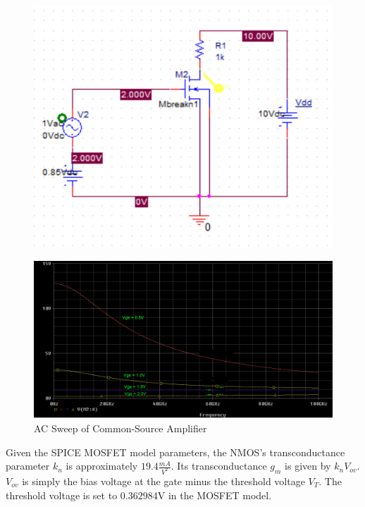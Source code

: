 \FloatBarrier

\begin{figure}[h!]
	\centering
	\includegraphics[scale=0.75]{../images/circuit2.PNG}
	\caption{}
	\label{fig:circuit2}
\end{figure}

\FloatBarrier

\FloatBarrier

\begin{figure}[h!]
	\centering
	\includegraphics[scale=0.75]{../images/vout_vs_f.PNG}
	\caption{AC Sweep of Common-Source Amplifier}
	\label{fig:vout_vs_f}
\end{figure}

\FloatBarrier

Given the SPICE MOSFET model parameters, the NMOS's transconductance parameter $k_n$ is approximately $19.4 \frac{mA}{V^2}$. Its transconductance $g_m$ is given by $k_n V_{ov}$. $V_{ov}$ is simply the bias voltage at the gate minus the threshold voltage $V_T$. The threshold voltage is set to $0.362984$\si{\volt} in the MOSFET model.

